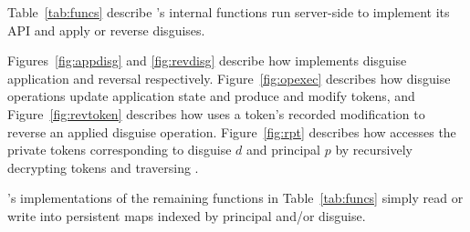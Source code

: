 Table~\ref{tab:funcs} describe \sys's internal functions run server-side to implement its API 
and apply or reverse disguises. 

Figures~\ref{fig:appdisg} and \ref{fig:revdisg} describe how \sys implements disguise application and
reversal respectively. Figure~\ref{fig:opexec} describes how disguise operations update application
state and produce and modify tokens, and 
Figure~\ref{fig:revtoken} describes how \sys uses a token's recorded
modification to reverse an applied disguise operation. 
Figure~\ref{fig:rpt} describes how \sys accesses the private tokens
corresponding to disguise $d$ and principal $p$ by recursively decrypting tokens and traversing
.

\sys's implementations of the remaining functions in Table~\ref{tab:funcs} simply read or write into
persistent maps indexed by principal and/or disguise.

